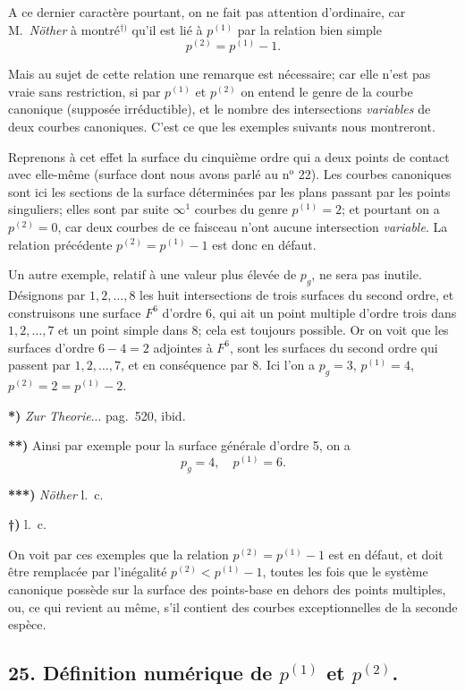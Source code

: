 \documentclass{article}
\begin{document}
A ce dernier caractère pourtant, on ne fait pas attention d'ordinaire, car M.\ \emph{Nöther} à montré${}^{\dagger)}$ qu'il est lié à $p^{(1)}$ par la relation bien simple
\[
p^{(2)} = p^{(1)} - 1.
\]

Mais au sujet de cette relation une remarque est nécessaire; car elle n'est pas vraie sans restriction, si par $p^{(1)}$ et $p^{(2)}$ on entend le genre de la courbe canonique (supposée irréductible), et le nombre des intersections \emph{variables} de deux courbes canoniques. C'est ce que les exemples suivants nous montreront.

Reprenons à cet effet la surface du cinquième ordre qui a deux points de contact avec elle-même (surface dont nous avons parlé au n${}^{\text{o}}$ 22). Les courbes canoniques sont ici les sections de la surface déterminées par les plans passant par les points singuliers; elles sont par suite $\infty^{1}$ courbes du genre $p^{(1)} = 2$; et pourtant on a $p^{(2)} = 0$, car deux courbes de ce faisceau n'ont aucune intersection \emph{variable}. La relation précédente $p^{(2)} = p^{(1)} - 1$ est donc en défaut.

Un autre exemple, relatif à une valeur plus élevée de $p_{g}$, ne sera pas inutile. Désignons par $1, 2, \ldots, 8$ les huit intersections de trois surfaces du second ordre, et construisons une surface $F^{6}$ d'ordre 6, qui ait un point multiple d'ordre trois dans $1, 2, \ldots, 7$ et un point simple dans 8; cela est toujours possible. Or on voit que les surfaces d'ordre $6 - 4 = 2$ adjointes à $F^{6}$, sont les surfaces du second ordre qui passent par $1, 2, \ldots, 7$, et en conséquence par 8. Ici l'on a $p_{g} = 3$, $p^{(1)} = 4$, $p^{(2)} = 2 = p^{(1)} - 2$.

\textbf{*)} \emph{Zur Theorie}... pag.\ 520, ibid.

\textbf{**)} Ainsi par exemple pour la surface générale d'ordre 5, on a
\[
p_{g} = 4, \quad p^{(1)} = 6.
\]

\textbf{***)} \emph{Nöther} l.\ c.

\textbf{†)} l.\ c.


On voit par ces exemples que la relation $p^{(2)} = p^{(1)} - 1$ est en défaut, et doit être remplacée par l'inégalité $p^{(2)} < p^{(1)} - 1$, toutes les fois que le système canonique possède sur la surface des points-base en dehors des points multiples, ou, ce qui revient au même, s'il contient des courbes exceptionnelles de la seconde espèce.

\subsection*{25. Définition numérique de $p^{(1)}$ et $p^{(2)}$.}
\end{document}

